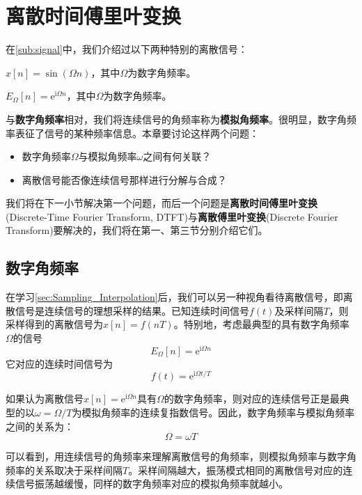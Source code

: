 \section{离散时间傅里叶变换}\label{sec:DTFT}

在\ref{sub:signal}中，我们介绍过以下两种特别的离散信号：

\begin{definition}[离散正弦信号]
    $x[n]=\sin(\Omega n)$，其中$\Omega$为数字角频率。
\end{definition}
\begin{definition}[离散复指数信号]
    $E_{\Omega}[n]=\mathrm{e}^{\mathrm{i}\Omega n}$，其中$\Omega$为数字角频率。
\end{definition}

与\textbf{数字角频率}相对，我们将连续信号的角频率称为\textbf{模拟角频率}。很明显，数字角频率表征了信号的某种频率信息。本章要讨论这样两个问题：\begin{itemize}
    \item 数字角频率$\Omega$与模拟角频率$\omega$之间有何关联？
    \item 离散信号能否像连续信号那样进行分解与合成？
\end{itemize}

我们将在下一小节解决第一个问题，而后一个问题是\textbf{离散时间傅里叶变换}(Discrete-Time Fourier Transform, DTFT)与\textbf{离散傅里叶变换}(Discrete Fourier Transform)要解决的，我们将在第一、第三节分别介绍它们。

\subsection{数字角频率}\label{sub:digital_freq}

在学习\ref{sec:Sampling_Interpolation}后，我们可以另一种视角看待离散信号，即离散信号是连续信号的理想采样的结果。已知连续时间信号$f(t)$及采样间隔$T$，则采样得到的离散信号为$x[n]=f(nT)$。特别地，考虑最典型的具有数字角频率$\Omega$的信号
$$E_{\Omega}[n]=\mathrm{e}^{\mathrm{i}\Omega n}$$
它对应的连续时间信号为
\[f(t)=\mathrm{e}^{\mathrm{i}\Omega t/T}\]

如果认为离散信号$x[n]=\mathrm{e}^{\mathrm{i}\Omega n}$具有$\Omega$的数字角频率，则对应的连续信号正是最典型的以$\omega=\Omega/T$为模拟角频率的连续复指数信号。因此，数字角频率与模拟角频率之间的关系为：
\[\Omega=\omega T\]

可以看到，用连续信号的角频率来理解离散信号的角频率，则模拟角频率与数字角频率的关系取决于采样间隔$T$。采样间隔越大，振荡模式相同的离散信号对应的连续信号振荡越缓慢，同样的数字角频率对应的模拟角频率就越小。

